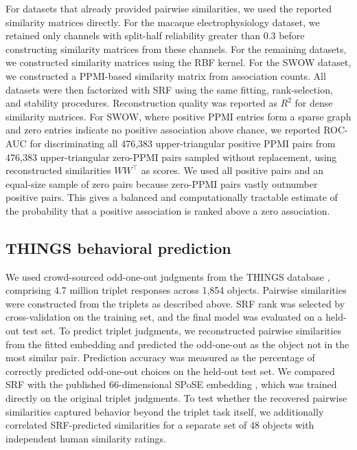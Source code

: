 \documentclass{article}
\begin{document}
For datasets that already provided pairwise similarities, we used the reported similarity matrices directly. For the macaque electrophysiology dataset, we retained only channels with split-half reliability greater than 0.3 before constructing similarity matrices from these channels. For the remaining datasets, we constructed similarity matrices using the RBF kernel. For the SWOW dataset, we constructed a PPMI-based similarity matrix from association counts. All datasets were then factorized with SRF using the same fitting, rank-selection, and stability procedures. Reconstruction quality was reported as $R^2$ for dense similarity matrices. For SWOW, where positive PPMI entries form a sparse graph and zero entries indicate no positive association above chance, we reported ROC-AUC for discriminating all 476{,}383 upper-triangular positive PPMI pairs from 476{,}383 upper-triangular zero-PPMI pairs sampled without replacement, using reconstructed similarities $WW^\top$ as scores. We used all positive pairs and an equal-size sample of zero pairs because zero-PPMI pairs vastly outnumber positive pairs. This gives a balanced and computationally tractable estimate of the probability that a positive association is ranked above a zero association.


\subsection{THINGS behavioral prediction}

We used crowd-sourced odd-one-out judgments from the THINGS database \citep{Hebart2019}, comprising 4.7 million triplet responses across 1{,}854 objects. Pairwise similarities were constructed from the triplets as described above. SRF rank was selected by cross-validation on the training set, and the final model was evaluated on a held-out test set. To predict triplet judgments, we reconstructed pairwise similarities from the fitted embedding and predicted the odd-one-out as the object not in the most similar pair. Prediction accuracy was measured as the percentage of correctly predicted odd-one-out choices on the held-out test set. We compared SRF with the published 66-dimensional SPoSE embedding \citep{Hebart2020}, which was trained directly on the original triplet judgments. To test whether the recovered pairwise similarities captured behavior beyond the triplet task itself, we additionally correlated SRF-predicted similarities for a separate set of 48 objects with independent human similarity ratings.
\end{document}
